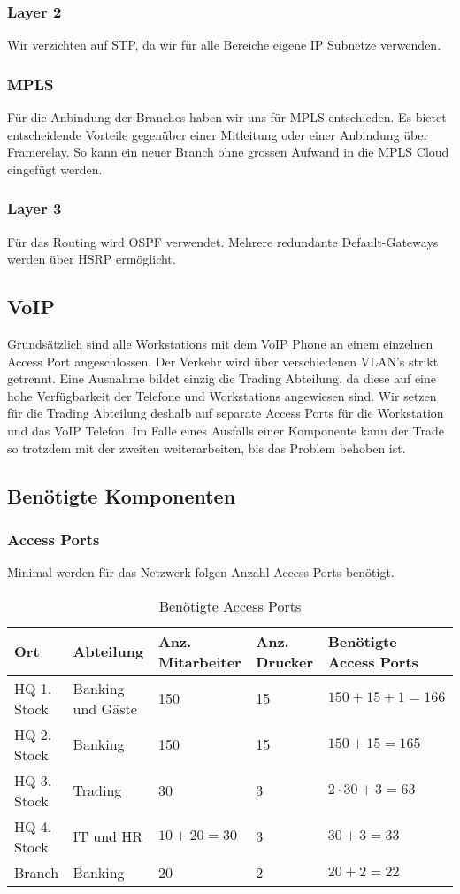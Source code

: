 \subsubsection{Layer 2}
Wir verzichten auf STP, da wir für alle Bereiche eigene IP Subnetze verwenden. 

\subsubsection{MPLS}
Für die Anbindung der Branches haben wir uns für MPLS entschieden. Es bietet entscheidende Vorteile gegenüber einer Mitleitung oder einer Anbindung über Framerelay. So kann ein neuer Branch ohne grossen Aufwand in die MPLS Cloud eingefügt werden.

\subsubsection{Layer 3}
Für das Routing wird OSPF verwendet. Mehrere redundante Default-Gateways werden über HSRP ermöglicht.

\subsection{VoIP}
Grundsätzlich sind alle Workstations mit dem VoIP Phone an einem einzelnen Access Port angeschlossen. Der Verkehr wird über verschiedenen VLAN's strikt getrennt. Eine Ausnahme bildet einzig die Trading Abteilung, da diese auf eine hohe Verfügbarkeit der Telefone und Workstations angewiesen sind. Wir setzen für die Trading Abteilung deshalb auf separate Access Ports für die Workstation und das VoIP Telefon. Im Falle eines Ausfalls einer Komponente kann der Trade so trotzdem mit der zweiten weiterarbeiten, bis das Problem behoben ist.

\subsection{Benötigte Komponenten}
\subsubsection{Access Ports}
Minimal werden für das Netzwerk folgen Anzahl Access Ports benötigt. 
\begin{table}[h]
	\centering
	\begin{tabu} to \linewidth {l l l l l}
		\toprule 
		Ort & Abteilung & Anz. Mitarbeiter & Anz. Drucker & Benötigte Access Ports \\
		\midrule
		HQ 1. Stock & Banking und Gäste & 150 & 15 & $150 + 15 + 1 = 166$ \\ 
		HQ 2. Stock & Banking & 150 & 15 & $150 + 15 = 165$ \\
		HQ 3. Stock & Trading & 30 & 3 & $2 \cdot 30 + 3 = 63$ \\ 
		HQ 4. Stock & IT und HR & $10 + 20 = 30$ & 3 & $30 + 3 = 33$\\
		Branch  & Banking & 20 & 2 & $20 + 2 = 22$\\
		\bottomrule 
	\end{tabu} 
	\label{tbl:require_access_ports}
	\caption{Benötigte Access Ports}
\end{table}

